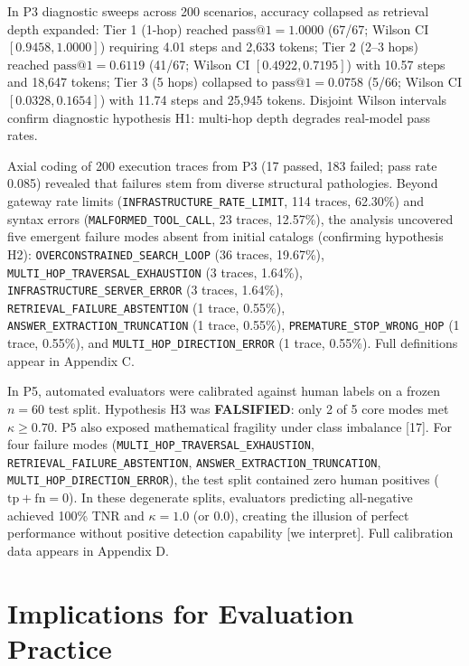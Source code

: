 \documentclass[11pt,letterpaper]{article}
\begin{document}
In P3 diagnostic sweeps across 200 scenarios, accuracy collapsed as retrieval depth expanded: Tier 1 (1-hop) reached $\text{pass@1} = 1.0000$ (67/67; Wilson CI $[0.9458, 1.0000]$) requiring 4.01 steps and 2,633 tokens; Tier 2 (2–3 hops) reached $\text{pass@1} = 0.6119$ (41/67; Wilson CI $[0.4922, 0.7195]$) with 10.57 steps and 18,647 tokens; Tier 3 (5 hops) collapsed to $\text{pass@1} = 0.0758$ (5/66; Wilson CI $[0.0328, 0.1654]$) with 11.74 steps and 25,945 tokens. Disjoint Wilson intervals confirm diagnostic hypothesis H1: multi-hop depth degrades real-model pass rates.

Axial coding of 200 execution traces from P3 (17 passed, 183 failed; pass rate 0.085) revealed that failures stem from diverse structural pathologies. Beyond gateway rate limits (\texttt{INFRASTRUCTURE\_RATE\_LIMIT}, 114 traces, 62.30\%) and syntax errors (\texttt{MALFORMED\_TOOL\_CALL}, 23 traces, 12.57\%), the analysis uncovered five emergent failure modes absent from initial catalogs (confirming hypothesis H2): \texttt{OVERCONSTRAINED\_SEARCH\_LOOP} (36 traces, 19.67\%), \texttt{MULTI\_HOP\_TRAVERSAL\_EXHAUSTION} (3 traces, 1.64\%), \texttt{INFRASTRUCTURE\_SERVER\_ERROR} (3 traces, 1.64\%), \texttt{RETRIEVAL\_FAILURE\_ABSTENTION} (1 trace, 0.55\%), \texttt{ANSWER\_EXTRACTION\_TRUNCATION} (1 trace, 0.55\%), \texttt{PREMATURE\_STOP\_WRONG\_HOP} (1 trace, 0.55\%), and \texttt{MULTI\_HOP\_DIRECTION\_ERROR} (1 trace, 0.55\%). Full definitions appear in Appendix C.

In P5, automated evaluators were calibrated against human labels on a frozen $n=60$ test split. Hypothesis H3 was \textbf{FALSIFIED}: only 2 of 5 core modes met $\kappa \ge 0.70$. P5 also exposed mathematical fragility under class imbalance [17]. For four failure modes (\texttt{MULTI\_HOP\_TRAVERSAL\_EXHAUSTION}, \texttt{RETRIEVAL\_FAILURE\_ABSTENTION}, \texttt{ANSWER\_EXTRACTION\_TRUNCATION}, \texttt{MULTI\_HOP\_DIRECTION\_ERROR}), the test split contained zero human positives ($\text{tp} + \text{fn} = 0$). In these degenerate splits, evaluators predicting all-negative achieved 100\% TNR and $\kappa = 1.0$ (or 0.0), creating the illusion of perfect performance without positive detection capability [we interpret]. Full calibration data appears in Appendix D.



\section{Implications for Evaluation Practice}
\end{document}
